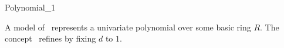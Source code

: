 \begin{ccRefConcept}{Polynomial_1}

\ccDefinition

A model of \ccRefName\ represents a univariate polynomial over some basic ring 
$R$. The concept \ccRefName\ refines  by fixing $d$ to $1$.

\ccRefines

\\

\ccSeeAlso 

\\
\\
\\

\ccHasModels

\end{ccRefConcept}
